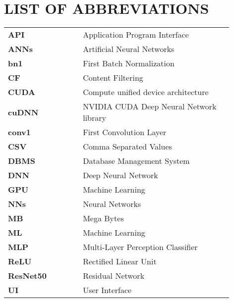 \section*{\MakeUppercase{List of Abbreviations}}
\begin{table}[h]

    \renewcommand{\arraystretch}{1.5}
    \begin{tabular}{@{}p{0.3\linewidth}p{0.6\linewidth}@{}}
        \textbf{API} &  Application Program Interface \\
\textbf{ANNs} & Artificial Neural Networks \\
\textbf{bn1} & First Batch Normalization\\
\textbf{CF} & Content Filtering\\
\textbf{CUDA} & Compute unified device architecture \\
\textbf{cuDNN} &  NVIDIA CUDA Deep Neural Network library \\
\textbf{conv1} & First Convolution Layer\\
\textbf{CSV} &  Comma Separated Values \\
\textbf{DBMS} &  Database Management System \\
\textbf{DNN}  &  Deep Neural Network \\
\textbf{GPU} & Machine Learning \\
\textbf{NNs} & Neural Networks \\
\textbf{MB}  &  Mega Bytes\\
\textbf{ML} & Machine Learning \\
\textbf{MLP} &  Multi-Layer Perception Classifier \\
\textbf{ReLU} & Rectified Linear Unit\\
\textbf{ResNet50} & Residual Network \\
\textbf{UI} & User Interface\\
    \end{tabular}
\end{table}